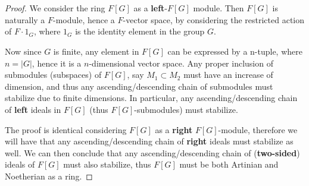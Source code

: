 \documentclass{article}
\theoremstyle{plain}
\begin{document}
\section{}
\begin{proof}
We consider the ring $F[G]$ as a \textbf{left}-$F[G]$ module. Then $F[G]$ is naturally a
$F$-module, hence a $F$-vector space, by considering the restricted action of
$F\cdot1_{G}$, where $1_{G}$ is the identity element in the group $G$.\medskip

Now since $G$ is finite, any element in $F[G]$ can be expressed by a n-tuple,
where $n=|G|$, hence it is a $n$-dimensional vector space. Any proper inclusion
of submodules (subspaces) of $F[G]$, say $M_{1}\subset M_{2}$ must have an increase of
dimension, and thus any ascending/descending chain of submodules must stabilize
due to finite dimensions. In particular, any ascending/descending chain of
\textbf{left} ideals in $F[G]$ (thus $F[G]$-submodules) must stabilize.\medskip

The proof is identical considering $F[G]$ as a \textbf{right }$F[G]$-module,
therefore we will have that any ascending/descending chain of \textbf{right}
ideals must stabilize as well. We can then conclude that any
ascending/descending chain of (\textbf{two-sided}) ideals of $F[G]$ must also
stabilize, thus $F[G]$ must be both Artinian and Noetherian as a ring.
\end{proof}
\end{document}
